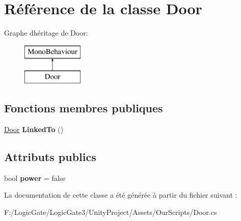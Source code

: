 \hypertarget{class_door}{}\section{Référence de la classe Door}
\label{class_door}
Graphe d\textquotesingle{}héritage de Door\+:\begin{figure}[H]
\begin{center}
\leavevmode
\includegraphics[height=2.000000cm]{class_door}
\end{center}
\end{figure}
\subsection*{Fonctions membres publiques}
\begin{DoxyCompactItemize}
\item 
\mbox{\label{class_door_a4f710644553e0909584c57d2eac9a69b}} 
\mbox{\hyperlink{class_door}{Door}} {\bfseries Linked\+To} ()
\end{DoxyCompactItemize}
\subsection*{Attributs publics}
\begin{DoxyCompactItemize}
\item 
\mbox{\label{class_door_af18a6dccacf615f278ab503e25cafeb9}} 
bool {\bfseries power} = false
\end{DoxyCompactItemize}


La documentation de cette classe a été générée à partir du fichier suivant \+:\begin{DoxyCompactItemize}
\item 
F\+:/\+Logic\+Gate/\+Logic\+Gate3/\+Unity\+Project/\+Assets/\+Our\+Scripts/Door.\+cs\end{DoxyCompactItemize}
